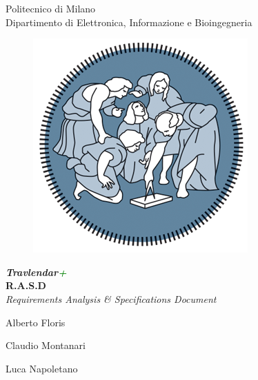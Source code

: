 \thispagestyle{empty}
\begin{center}

	\Huge Politecnico di Milano  \\   	\vspace{14pt}
    \Large Dipartimento di Elettronica, Informazione e Bioingegneria
    
    \vspace{30pt}
    
      \begin{figure}[h]
      	\centering
        \includegraphics[scale=0.7]{Pictures/logo.png}
      \end{figure}
    
    \vspace{25pt}
    
    \Huge \textbf{\emph{Travlendar\textcolor{Green}{+}}} 
    \\
    \vspace{12pt}
    \huge \textbf{R.A.S.D} \\
    \vspace{7pt}
    \Large \emph{Requirements Analysis \& Specifications Document} \\
    
    \vspace{100pt}
    
    \large Alberto Floris \\
    
    \vspace{5pt}
    
    \large Claudio Montanari \\
    
    \vspace{5pt}
    
    \large Luca Napoletano
    
    
\end{center}